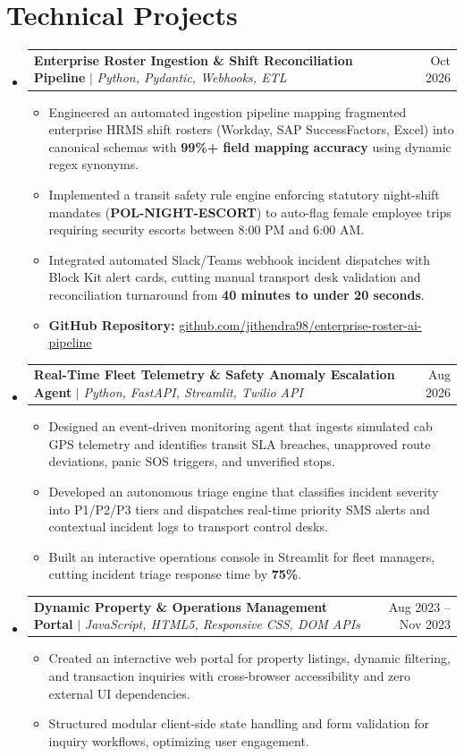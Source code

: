 \documentclass[letterpaper,10.8pt]{article}
\makeatletter
\newcommand{\resumeItem}[1]{
  \item\small{
    {#1 \vspace{-2.2pt}}
  }
}
\newcommand{\resumeProjectHeading}[2]{
    \item
    \begin{tabular*}{0.97\textwidth}{l@{\extracolsep{\fill}}r}
      \small#1 & #2 \\
    \end{tabular*}\vspace{-6pt}
}
\newcommand{\resumeSubHeadingListStart}{\begin{itemize}[leftmargin=0.15in, label={}]}
\newcommand{\resumeSubHeadingListEnd}{\end{itemize}}
\newcommand{\resumeItemListStart}{\begin{itemize}[leftmargin=0.15in]}
\newcommand{\resumeItemListEnd}{\end{itemize}\vspace{-5pt}}
\makeatother
\begin{document}
\section{Technical Projects}
    \resumeSubHeadingListStart
      \resumeProjectHeading
          {\textbf{Enterprise Roster Ingestion \& Shift Reconciliation Pipeline} $|$ \emph{Python, Pydantic, Webhooks, ETL}}{Oct 2026}
          \resumeItemListStart
            \resumeItem{Engineered an automated ingestion pipeline mapping fragmented enterprise HRMS shift rosters (Workday, SAP SuccessFactors, Excel) into canonical schemas with \textbf{99\%+ field mapping accuracy} using dynamic regex synonyms.}
            \resumeItem{Implemented a transit safety rule engine enforcing statutory night-shift mandates (\textbf{POL-NIGHT-ESCORT}) to auto-flag female employee trips requiring security escorts between 8:00 PM and 6:00 AM.}
            \resumeItem{Integrated automated Slack/Teams webhook incident dispatches with Block Kit alert cards, cutting manual transport desk validation and reconciliation turnaround from \textbf{40 minutes to under 20 seconds}.}
            \resumeItem{\textbf{GitHub Repository:} \href{https://github.com/jithendra98/enterprise-roster-ai-pipeline}{\underline{github.com/jithendra98/enterprise-roster-ai-pipeline}}}
          \resumeItemListEnd

      \resumeProjectHeading
          {\textbf{Real-Time Fleet Telemetry \& Safety Anomaly Escalation Agent} $|$ \emph{Python, FastAPI, Streamlit, Twilio API}}{Aug 2026}
          \resumeItemListStart
            \resumeItem{Designed an event-driven monitoring agent that ingests simulated cab GPS telemetry and identifies transit SLA breaches, unapproved route deviations, panic SOS triggers, and unverified stops.}
            \resumeItem{Developed an autonomous triage engine that classifies incident severity into P1/P2/P3 tiers and dispatches real-time priority SMS alerts and contextual incident logs to transport control desks.}
            \resumeItem{Built an interactive operations console in Streamlit for fleet managers, cutting incident triage response time by \textbf{75\%}.}
          \resumeItemListEnd

      \resumeProjectHeading
          {\textbf{Dynamic Property \& Operations Management Portal} $|$ \emph{JavaScript, HTML5, Responsive CSS, DOM APIs}}{Aug 2023 -- Nov 2023}
          \resumeItemListStart
            \resumeItem{Created an interactive web portal for property listings, dynamic filtering, and transaction inquiries with cross-browser accessibility and zero external UI dependencies.}
            \resumeItem{Structured modular client-side state handling and form validation for inquiry workflows, optimizing user engagement.}
          \resumeItemListEnd
    \resumeSubHeadingListEnd
\end{document}
